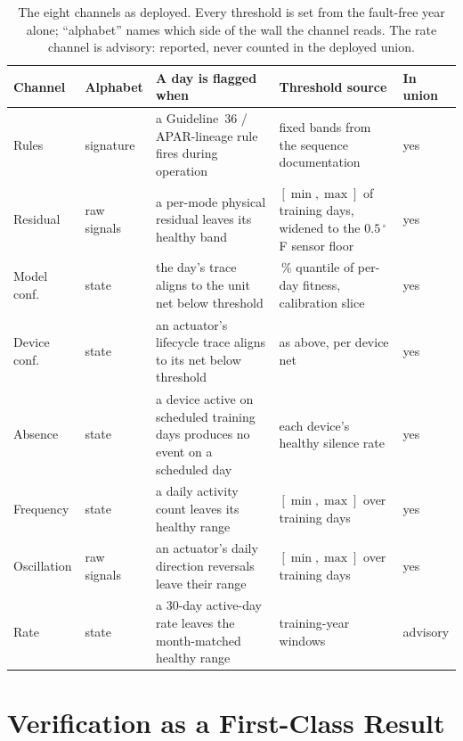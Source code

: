 \documentclass[11pt,letterpaper]{article}
\begin{document}
\begin{table}[t]
\centering
\caption{The eight channels as deployed. Every threshold is set from the fault-free year alone; ``alphabet'' names which side of the wall the channel reads. The rate channel is advisory: reported, never counted in the deployed union.}
\label{tab:channels}
\footnotesize\setlength{\tabcolsep}{4pt}
\begin{tabular}{@{}>{\raggedright\arraybackslash}p{1.8cm}>{\raggedright\arraybackslash}p{1.4cm}>{\raggedright\arraybackslash}p{5.8cm}>{\raggedright\arraybackslash}p{5.0cm}>{\raggedright\arraybackslash}p{1.1cm}@{}}
\hline
Channel & Alphabet & A day is flagged when & Threshold source & In union \\
\hline
Rules & signature & a Guideline~36 / APAR-lineage rule fires during operation & fixed bands from the sequence documentation & yes \\
Residual & raw signals & a per-mode physical residual leaves its healthy band & $[\min,\max]$ of training days, widened to the $0.5\,^\circ$F sensor floor & yes \\
Model conf. & state & the day's trace aligns to the unit net below threshold & 1\,\% quantile of per-day fitness, calibration slice & yes \\
Device conf. & state & an actuator's lifecycle trace aligns to its net below threshold & as above, per device net & yes \\
Absence & state & a device active on scheduled training days produces no event on a scheduled day & each device's healthy silence rate & yes \\
Frequency & state & a daily activity count leaves its healthy range & $[\min,\max]$ over training days & yes \\
Oscillation & raw signals & an actuator's daily direction reversals leave their range & $[\min,\max]$ over training days & yes \\
Rate & state & a 30-day active-day rate leaves the month-matched healthy range & training-year windows & advisory \\
\hline
\end{tabular}
\end{table}

\section{Verification as a First-Class Result}
\label{sec:protocol}
\end{document}
